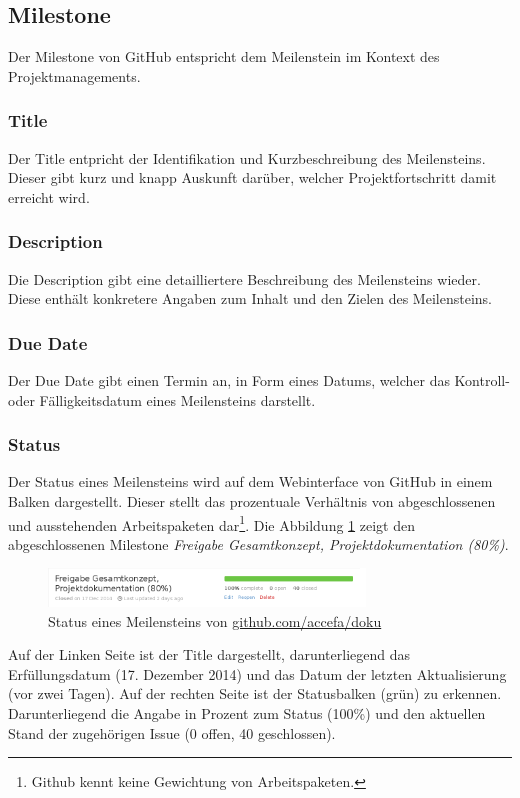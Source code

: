 \subsection{Milestone}
Der \gls{Milestone} von GitHub entspricht dem Meilenstein im Kontext des
Projektmanagements.

\subsubsection{Title}
Der \gls{Title} entpricht der Identifikation und Kurzbeschreibung des
Meilensteins. Dieser gibt kurz und knapp Auskunft darüber, welcher
Projektfortschritt damit erreicht wird.

\subsubsection{Description}
Die \gls{Description} gibt eine detailliertere Beschreibung des Meilensteins
wieder. Diese enthält konkretere Angaben zum Inhalt und den Zielen des
Meilensteins.

\subsubsection{Due Date}
Der \gls{Due Date} gibt einen Termin an, in Form eines Datums, welcher das
Kontroll- oder Fälligkeitsdatum eines Meilensteins darstellt.

\subsubsection{Status}
Der Status eines Meilensteins wird auf dem Webinterface von GitHub in einem
Balken dargestellt. Dieser stellt das prozentuale Verhältnis von
abgeschlossenen und ausstehenden Arbeitspaketen dar\footnote{Github kennt
keine Gewichtung von Arbeitspaketen.}. Die Abbildung
\ref{fig:milestone_progress} zeigt den abgeschlossenen
\gls{Milestone} \emph{Freigabe Gesamtkonzept, Projektdokumentation (80\%)}.
\begin{figure}[h!]
	\centering
	\includegraphics[width=0.75\textwidth]{../../fig/github/milestone_progress.png}
	\caption{Status eines Meilensteins von \url{github.com/accefa/doku}}
	\label{fig:milestone_progress}
\end{figure}

Auf der Linken Seite ist der \gls{Title} dargestellt, darunterliegend das
Erfüllungsdatum (17. Dezember 2014) und das Datum der letzten Aktualisierung
(vor zwei Tagen). Auf der rechten Seite ist der Statusbalken (grün) zu
erkennen. Darunterliegend die Angabe in Prozent zum Status (100\%) und den
aktuellen Stand der zugehörigen \gls{Issue} (0 offen, 40 geschlossen).
